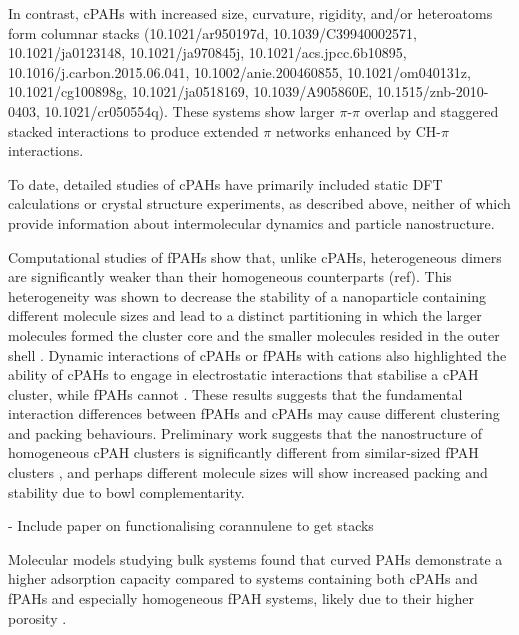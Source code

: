 In contrast, cPAHs with increased size, curvature, rigidity, and/or heteroatoms form columnar stacks (10.1021/ar950197d, 10.1039/C39940002571, 10.1021/ja0123148, 10.1021/ja970845j, 10.1021/acs.jpcc.6b10895, 10.1016/j.carbon.2015.06.041, 10.1002/anie.200460855, 10.1021/om040131z, 10.1021/cg100898g, 10.1021/ja0518169, 10.1039/A905860E, 10.1515/znb-2010-0403, 10.1021/cr050554q). These systems show larger $\pi$-$\pi$ overlap and staggered stacked interactions to produce extended $\pi$ networks enhanced by CH-$\pi$ interactions.


To date, detailed studies of cPAHs have primarily included static DFT calculations or crystal structure experiments, as described above, neither of which provide information about intermolecular dynamics and particle nanostructure.


Computational studies of fPAHs show that, unlike cPAHs, heterogeneous dimers are significantly weaker than their homogeneous counterparts (ref). This heterogeneity was shown to decrease the stability of a nanoparticle containing different molecule sizes and lead to a distinct partitioning in which the larger molecules formed the cluster core and the smaller molecules resided in the outer shell \cite{bowal2018partitioning}. Dynamic interactions of cPAHs or fPAHs with cations also highlighted the ability of cPAHs to engage in electrostatic interactions that stabilise a cPAH cluster, while fPAHs cannot \cite{bowal2019ion}. These results suggests that the fundamental interaction differences between fPAHs and cPAHs may cause different clustering and packing behaviours. Preliminary work suggests that the nanostructure of homogeneous cPAH clusters is significantly different from similar-sized fPAH clusters \cite{bowal2019ion}, and perhaps different molecule sizes will show increased packing and stability due to bowl complementarity.

- Include paper on functionalising corannulene to get stacks

Molecular models studying bulk systems found that curved PAHs demonstrate a higher adsorption capacity compared to systems containing both cPAHs and fPAHs and especially homogeneous fPAH systems, likely due to their higher porosity \cite{zhang2020molecular}.


